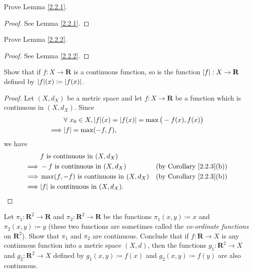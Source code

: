 \exercisesection

\begin{exercise}\label{ex 2.2.1}
    Prove Lemma \ref{2.2.1}.
\end{exercise}

\begin{proof}
    See Lemma \ref{2.2.1}.
\end{proof}

\begin{exercise}\label{ex 2.2.2}
    Prove Lemma \ref{2.2.2}.
\end{exercise}

\begin{proof}
    See Lemma \ref{2.2.2}.
\end{proof}

\begin{exercise}\label{ex 2.2.3}
    Show that if \(f : X \to \mathbf{R}\) is a continuous function, so is the function \(\abs*{f} : X \to \mathbf{R}\) defined by \(\abs*{f}(x) \coloneqq \abs*{f(x)}\).
\end{exercise}

\begin{proof}
    Let \((X, d_X)\) be a metric space and let \(f : X \to \mathbf{R}\) be a function which is continuous in \((X, d_X)\).
    Since
    \begin{align*}
                 & \forall\ x_0 \in X, \abs*{f}(x) = \abs*{f(x)} = \max\big(-f(x), f(x)\big) \\
        \implies & \abs*{f} = \max(-f, f),
    \end{align*}
    we have
    \begin{align*}
                 & f \text{ is continuous in } (X, d_X)                                                  \\
        \implies & -f \text{ is continuous in } (X, d_X)          & \text{(by Corollary \ref{2.2.3}(b))} \\
        \implies & \max(f, -f) \text{ is continuous in } (X, d_X) & \text{(by Corollary \ref{2.2.3}(b))} \\
        \implies & \abs*{f} \text{ is continuous in } (X, d_X).
    \end{align*}
\end{proof}

\begin{exercise}\label{ex 2.2.4}
    Let \(\pi_1 : \mathbf{R}^2 \to \mathbf{R}\) and \(\pi_2 : \mathbf{R}^2 \to \mathbf{R}\) be the functions \(\pi_1(x, y) \coloneqq x\) and \(\pi_2(x, y) \coloneqq y\) (these two functions are sometimes called the \emph{co-ordinate functions} on \(\mathbf{R}^2\)).
    Show that \(\pi_1\) and \(\pi_2\) are continuous.
    Conclude that if \(f : \mathbf{R} \to X\) is any continuous function into a metric space \((X, d)\), then the functions \(g_1 : \mathbf{R}^2 \to X\) and \(g_2 : \mathbf{R}^2 \to X\) defined by \(g_1(x, y) \coloneqq f(x)\) and \(g_2(x, y) \coloneqq f(y)\) are also continuous.
\end{exercise}


